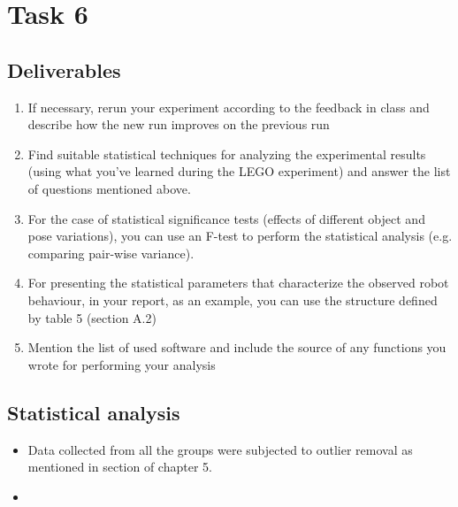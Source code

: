 

    \chapter{Task 6}
    \section{Deliverables }
    \begin{enumerate}
        \item If necessary, rerun your experiment according to the feedback in class and describe how the new run improves on the previous run
         \item Find suitable statistical techniques for analyzing the experimental results (using what you’ve learned during the LEGO experiment) and answer the list of questions mentioned above.
         \item For the case of statistical significance tests (effects of different object and pose variations), you can use an F-test to perform the statistical analysis (e.g. comparing pair-wise variance).
         \item For presenting the statistical parameters that characterize the observed robot behaviour, in your report, as an example, you can use the structure defined by table 5 (section A.2)
         \item Mention the  list of  used software  and include  the  source  of  any functions  you wrote  for performing your analysis
    \end{enumerate}
    
    \section{Statistical analysis}
    \begin{itemize}
        \item Data collected from all the groups were subjected to outlier removal as mentioned in section of chapter 5.
        \item 
    \end{itemize}
    
